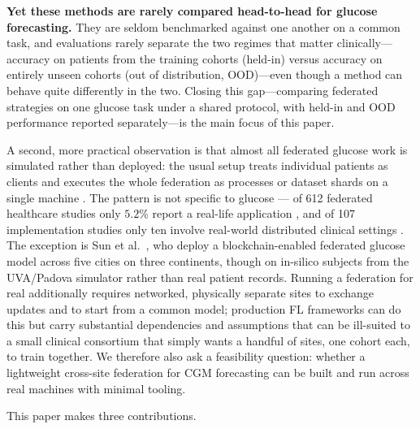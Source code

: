 \documentclass[10pt,letterpaper]{article}
\begin{document}
\textbf{Yet these methods are rarely compared head-to-head for glucose
forecasting.} They are seldom benchmarked against one another on a common task, and
evaluations rarely separate the two regimes that matter clinically---accuracy on
patients from the training cohorts (held-in) versus accuracy on entirely unseen
cohorts (out of distribution, OOD)---even though a method can behave quite
differently in the two. Closing this gap---comparing federated strategies on one
glucose task under a shared protocol, with held-in and OOD performance reported
separately---is the main focus of this paper.

A second, more practical observation is that almost all federated glucose work is
simulated rather than deployed: the usual setup treats individual patients as
clients and executes the whole federation as processes or dataset shards on a
single machine
\cite{piao2023graph,piao2026gluadfl,darpit2025fedglu,defalco2023federated}. The
pattern is not specific to glucose --- of 612 federated healthcare studies only
$5.2\%$ report a real-life application \cite{teo2024federated}, and of 107
implementation studies only ten involve real-world distributed clinical settings
\cite{li2025challenges}. The exception is Sun et al.\
\cite{sun2025multicontinental}, who deploy a blockchain-enabled federated glucose
model across five cities on three continents, though on in-silico subjects from
the UVA/Padova simulator rather than real patient records.
Running a federation for real additionally requires networked,
physically separate sites to exchange updates and to start from a common model;
production FL frameworks can do this but carry substantial dependencies and
assumptions that can be ill-suited to a small clinical consortium that simply wants
a handful of sites, one cohort each, to train together. We therefore also ask a
feasibility question: whether a lightweight cross-site federation for CGM
forecasting can be built and run across real machines with minimal tooling.

This paper makes three contributions.
\end{document}
